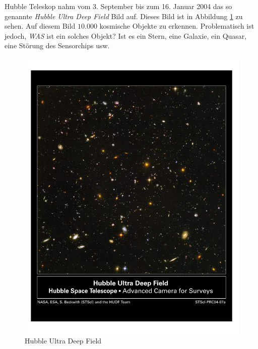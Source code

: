 \documentclass[12pt,journal,compsoc]{IEEEtran}
\begin{document}
% 
% 
% 
% 
 Hubble Teleskop nahm vom 3. September bis zum 16. Januar
2004 das so genannte \emph{Hubble Ultra Deep Field} Bild auf. Dieses Bild ist in 
Abbildung \ref{fig:hs-2004-07-a-pdf} zu sehen. Auf diesem Bild $10.000$ kosmische Objekte zu erkennen.
Problematisch ist jedoch, \emph{WAS} ist ein solches Objekt? Ist es ein Stern, eine Galaxie,
ein Quasar, eine Störung des Sensorchips usw. 

\begin{figure}[!t]
\centering
\includegraphics[scale=0.45,trim={40 400 40 80},clip]{../beamer/hs-2004-07-a-pdf}
\caption{Hubble Ultra Deep Field \cite{HUDF}}
\label{fig:hs-2004-07-a-pdf}
\end{figure}
\end{document}
